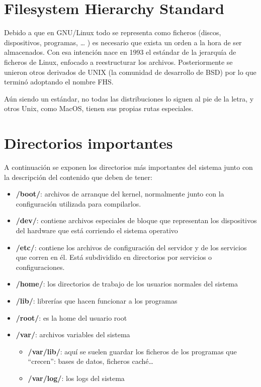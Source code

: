 \documentclass{../../../yukibook.cls/yukibook}
\begin{document}
\section{Filesystem Hierarchy Standard}
Debido a que en GNU/Linux todo se representa como ficheros (discos, dispositivos, programas, … ) es necesario que exista un orden a la hora de ser almacenados. Con esa intención nace en 1993 el estándar de la jerarquía de ficheros de Linux, enfocado a reestructurar los archivos. Posteriormente se unieron otros derivados de UNIX (la comunidad de desarrollo de BSD) por lo que terminó adoptando el nombre FHS.

Aún siendo un estándar, no todas las distribuciones lo siguen al pie de la letra, y otros Unix, como MacOS, tienen sus propias rutas especiales.


\section{Directorios importantes}
A continuación se exponen los directorios más importantes del sistema junto con la descripción del contenido que deben de tener:
\begin{itemize}

    \item \textbf{/boot/}: archivos de arranque del kernel, normalmente junto con la configuración utilizada para compilarlos.
    \item \textbf{/dev/}: contiene archivos especiales de bloque que representan los dispositivos del hardware que está corriendo el sistema operativo
    \item \textbf{/etc/}: contiene los archivos de configuración del servidor y de los servicios que corren en él. Está subdividido en directorios por servicios o configuraciones.
    \item \textbf{/home/}: los directorios de trabajo de los usuarios normales del sistema
    \item \textbf{/lib/}: librerías que hacen funcionar a los programas
    \item \textbf{/root/}: es la home del usuario root
    \item \textbf{/var/}: archivos variables del sistema
    \begin{itemize}
      \item \textbf{/var/lib/}: aquí se suelen guardar los ficheros de los programas que “crecen”: bases de datos, ficheros caché…
      \item \textbf{/var/log/}: los logs del sistema
    \end{itemize}
\end{itemize}
\end{document}
